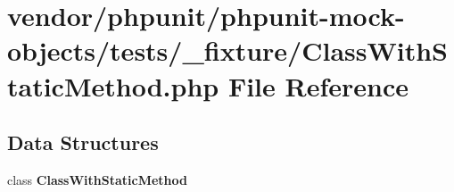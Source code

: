 \section{vendor/phpunit/phpunit-\/mock-\/objects/tests/\+\_\+fixture/\+Class\+With\+Static\+Method.php File Reference}
\label{_class_with_static_method_8php}
\subsection*{Data Structures}
\begin{DoxyCompactItemize}
\item 
class {\bf Class\+With\+Static\+Method}
\end{DoxyCompactItemize}
